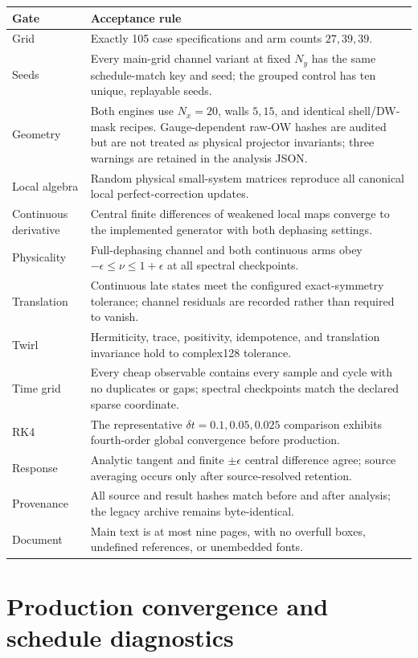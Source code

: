 \documentclass[aps,prb,onecolumn,nofootinbib]{revtex4-2}
\begin{document}
\begin{longtable}{p{}p{}}
\toprule
Gate & Acceptance rule\\
\midrule
\endhead
Grid & Exactly 105 case specifications and arm counts $27,39,39$.\\
Seeds & Every main-grid channel variant at fixed $N_y$ has the same schedule-match key
and seed; the grouped control has ten unique, replayable seeds.\\
Geometry & Both engines use $N_x=20$, walls $5,15$, and identical shell/DW-mask
recipes.  Gauge-dependent raw-OW hashes are audited but are not treated as physical
projector invariants; three warnings are retained in the analysis JSON.\\
Local algebra & Random physical small-system matrices reproduce all canonical local
perfect-correction updates.\\
Continuous derivative & Central finite differences of weakened local maps converge to
the implemented generator with both dephasing settings.\\
Physicality & Full-dephasing channel and both continuous arms obey
$-\epsilon\le\nu\le1+\epsilon$ at all spectral checkpoints.\\
Translation & Continuous late states meet the configured exact-symmetry tolerance;
channel residuals are recorded rather than required to vanish.\\
Twirl & Hermiticity, trace, positivity, idempotence, and translation invariance hold to
complex128 tolerance.\\
Time grid & Every cheap observable contains every sample and cycle with no duplicates or
gaps; spectral checkpoints match the declared sparse coordinate.\\
RK4 & The representative $\delta t=0.1,0.05,0.025$ comparison exhibits fourth-order
global convergence before production.\\
Response & Analytic tangent and finite $\pm\epsilon$ central difference agree; source
averaging occurs only after source-resolved retention.\\
Provenance & All source and result hashes match before and after analysis; the legacy
archive remains byte-identical.\\
Document & Main text is at most nine pages, with no overfull boxes, undefined references,
or unembedded fonts.\\
\bottomrule
\end{longtable}

\section{Production convergence and schedule diagnostics}
\end{document}
